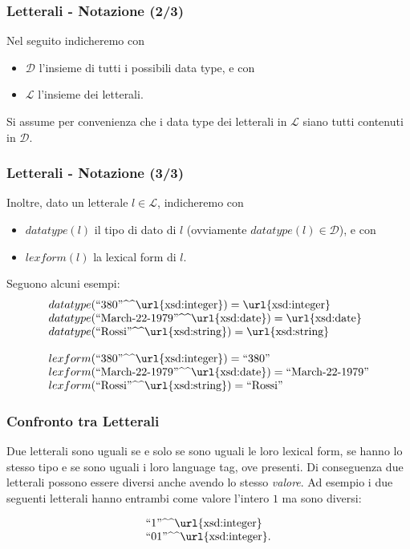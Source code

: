 \documentclass[8pt]{beamer}
\newcommand{\literal}[2]{\mbox{``#1''\textasciicircum\textasciicircum\url{#2}}} %
\newcommand{\literals}{\mathcal{L}}
\newcommand{\datatypes}{\mathcal{D}}
\newcommand{\stringLiteral}[1]{\mbox{``#1''}}
\begin{document}
\begin{frame}
\frametitle{Letterali - Notazione (2/3)}
  Nel seguito indicheremo con 
  \begin{itemize}
    \item $\datatypes$ l'insieme di tutti i possibili data type,
  e con
    \item $\literals$ l'insieme dei letterali.
  \end{itemize}
  \vspace{\baselineskip}

  Si assume per convenienza 
  che i data type dei letterali in $\literals$ siano tutti 
  contenuti in $\datatypes$.
\end{frame}

\newcommand{\mathurl}[1]{\mbox{\url{#1}}}

\begin{frame}
  \frametitle{Letterali - Notazione (3/3)}
  Inoltre, dato un letterale $l \in \literals$, indicheremo con
  \begin{itemize}
    \item $datatype(l)$ il tipo di dato di $l$ (ovviamente $datatype(l) \in \datatypes$), e con 
    \item $lexform(l)$ la lexical form di $l$.
  \end{itemize}
  \vspace{\baselineskip}

  Seguono alcuni esempi:
  \[
  \begin{array}{l}
    datatype(\literal{380}{xsd:integer}) = \mathurl{xsd:integer}\\
    datatype(\literal{March-22-1979}{xsd:date}) = \mathurl{xsd:date}\\
    datatype(\literal{Rossi}{xsd:string}) = \mathurl{xsd:string}\\
    \\
    lexform(\literal{380}{xsd:integer}) = \stringLiteral{380}\\
    lexform(\literal{March-22-1979}{xsd:date}) = \stringLiteral{March-22-1979}\\
    lexform(\literal{Rossi}{xsd:string}) = \stringLiteral{Rossi} 
  \end{array}
  \]
\end{frame}


\begin{frame}
\frametitle{Confronto tra Letterali}
  Due letterali sono uguali se e solo se sono uguali le loro lexical form,
  se hanno lo stesso tipo e se sono uguali i loro language tag, ove presenti.
  Di conseguenza due letterali possono essere diversi anche avendo lo stesso
  \emph{valore}. Ad esempio i due seguenti letterali hanno entrambi 
  come valore l'intero $1$ ma sono diversi:
  \vspace{\baselineskip}

  \[
  \begin{array}{l}
    \literal{1}{xsd:integer}\\
    \literal{01}{xsd:integer} .\\
  \end{array}
  \]
\end{frame}
\end{document}
